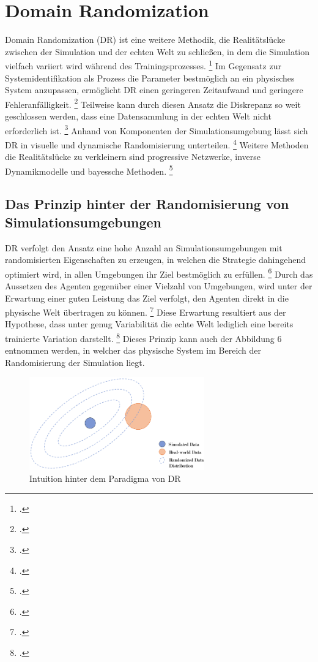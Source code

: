 \section{Domain Randomization}

Domain Randomization (DR) ist eine weitere Methodik, die Realitätslücke zwischen der Simulation und der echten Welt zu schließen, in dem die Simulation vielfach variiert wird während des Trainingsprozesses. \footcite[Vgl.][S. 3]{Bharadhwaj.2019}
Im Gegensatz zur Systemidentifikation als Prozess die Parameter bestmöglich an ein physisches System anzupassen, ermöglicht DR einen geringeren Zeitaufwand und geringere Fehleranfälligkeit. \footcite[Vgl.][S. 1]{Tobin.2017}
Teilweise kann durch diesen Ansatz die Diskrepanz so weit geschlossen werden, dass eine Datensammlung in der echten Welt nicht erforderlich ist. \footcite[Vgl.][S. 2]{Molchanov.2019}
Anhand von Komponenten der Simulationsumgebung lässt sich DR in visuelle und dynamische Randomisierung unterteilen. \footcite[Vgl.][S. 5]{Zhao.2020}
Weitere Methoden die Realitätslücke zu verkleinern sind progressive Netzwerke, inverse Dynamikmodelle und bayessche Methoden. \footcite[Vgl.][S. 2]{Chen.2021}

\subsection{Das Prinzip hinter der Randomisierung von Simulationsumgebungen}

DR verfolgt den Ansatz eine hohe Anzahl an Simulationsumgebungen mit randomisierten Eigenschaften zu erzeugen, in welchen die Strategie dahingehend optimiert wird, in allen Umgebungen ihr Ziel bestmöglich zu erfüllen. \footcite[Vgl.][S. 1]{Hsu.2023}
Durch das Aussetzen des Agenten gegenüber einer Vielzahl von Umgebungen, wird unter der Erwartung einer guten Leistung das Ziel verfolgt, den Agenten direkt in die physische Welt übertragen zu können. \footcite[Vgl.][S. 2]{Chen.2021}
Diese Erwartung resultiert aus der Hypothese, dass unter genug Variabilität die echte Welt lediglich eine bereits trainierte Variation darstellt. \footcite[Vgl.][S. 1]{Tobin.2017}
Dieses Prinzip kann auch der Abbildung 6 entnommen werden, in welcher das physische System im Bereich der Randomisierung der Simulation liegt. 

\begin{figure}[htb]
    \centering
    \includegraphics[height=4cm]{lib/graphics/Domain_randomization.png}
    \caption[Intuition hinter dem Paradigma von DR]{Intuition hinter dem Paradigma von DR\footnotemark}
    \label{abb:Domain_randomization}
\end{figure}

